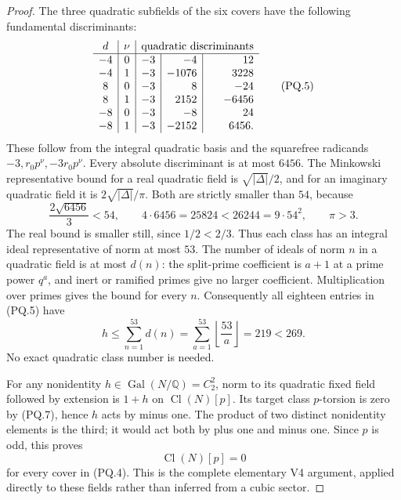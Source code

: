 \begin{proof}
The three quadratic subfields of the six covers have the following
fundamental discriminants:
\[
 \begin{array}{c|c|r|r|r}
 d&\nu&\multicolumn{3}{c}{\text{quadratic discriminants}}\\ \hline
 -4&0&-3&-4&12\\
 -4&1&-3&-1076&3228\\
  8&0&-3&8&-24\\
  8&1&-3&2152&-6456\\
 -8&0&-3&-8&24\\
 -8&1&-3&-2152&6456.
 \end{array}
 \tag{PQ.5}
\]
These follow from the integral quadratic basis and the squarefree
radicands $-3,r_0p^\nu,-3r_0p^\nu$.
Every absolute discriminant is at most $6456$.
The Minkowski representative bound for a real quadratic field is
$\sqrt{|\Delta|}/2$, and for an imaginary quadratic field it is
$2\sqrt{|\Delta|}/\pi$.
Both are strictly smaller than $54$, because
\[
 \frac{2\sqrt{6456}}3<54,
 \qquad 4\cdot6456=25824<26244=9\cdot54^2,
 \qquad \pi>3.
 \tag{PQ.6}
\]
The real bound is smaller still, since $1/2<2/3$.
Thus each class has an integral ideal representative of norm
at most $53$.
The number of ideals of norm $n$ in a quadratic field is at most
$d(n)$: the split-prime coefficient is $a+1$ at a prime power
$q^a$, and inert or ramified primes give no larger coefficient.
Multiplication over primes gives the bound for every $n$.
Consequently all eighteen entries in (PQ.5) have
\[
 h\leq\sum_{n=1}^{53}d(n)
      =\sum_{a=1}^{53}\left\lfloor\frac{53}{a}\right\rfloor
      =219<269.
 \tag{PQ.7}
\]
No exact quadratic class number is needed.

For any nonidentity $h\in\operatorname{Gal}(N/\mathbb Q)=C_2^2$,
norm to its quadratic fixed field followed by extension is
$1+h$ on $\operatorname{Cl}(N)[p]$.
Its target class $p$-torsion is zero by (PQ.7), hence $h$ acts
by minus one.  The product of two distinct nonidentity elements
is the third; it would act both by plus one and minus one.
Since $p$ is odd, this proves
\[
                            \operatorname{Cl}(N)[p]=0
 \tag{PQ.8}
\]
for every cover in (PQ.4).
This is the complete elementary V4 argument, applied directly to
these fields rather than inferred from a cubic sector.


\end{proof}
